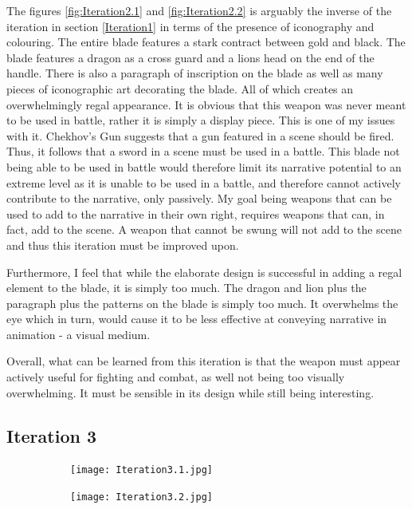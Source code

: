 \documentclass{article}
\begin{document}
The figures \ref{fig:Iteration2.1} and \ref{fig:Iteration2.2} is arguably the inverse of the iteration in section \ref{Iteration1} in terms of the presence of iconography and colouring. The entire blade features a stark contract between gold and black. The blade features a dragon as a cross guard and a lions head on the end of the handle. There is also a paragraph of inscription on the blade as well as many pieces of iconographic art decorating the blade. All of which creates an overwhelmingly regal appearance. It is obvious that this weapon was never meant to be used in battle, rather it is simply a display piece. This is one of my issues with it. Chekhov's Gun \parencite{delaney1990chekhov} suggests that a gun featured in a scene should be fired. Thus, it follows that a sword in a scene must be used in a battle. This blade not being able to be used in battle would therefore limit its narrative potential to an extreme level as it is unable to be used in a battle, and therefore cannot actively contribute to the narrative, only passively. My goal being weapons that can be used to add to the narrative in their own right, requires weapons that can, in fact, add to the scene. A weapon that cannot be swung will not add to the scene and thus this iteration must be improved upon.

Furthermore, I feel that while the elaborate design is successful in adding a regal element to the blade, it is simply too much. The dragon and lion plus the paragraph plus the patterns on the blade is simply too much. It overwhelms the eye which in turn, would cause it to be less effective at conveying narrative in animation - a visual medium.

Overall, what can be learned from this iteration is that the weapon must appear actively useful for fighting and combat, as well not being too visually overwhelming. It must be sensible in its design while still being interesting.

\pagebreak

\subsection{Iteration 3} \label{Iteration3}

\begin{figure}[h]
    \centering
    \caption{}
    \label{fig:Iteration3}
    \begin{subfigure}{0.49\textwidth}
        \texttt{[image: Iteration3.1.jpg]}
        \caption{}
        \label{fig:Iteration3.1}
    \end{subfigure}
    \begin{subfigure}{0.49\textwidth}
        \texttt{[image: Iteration3.2.jpg]}
        \caption{}
        \label{fig:Iteration3.2}
    \end{subfigure}
\end{figure}
\end{document}

